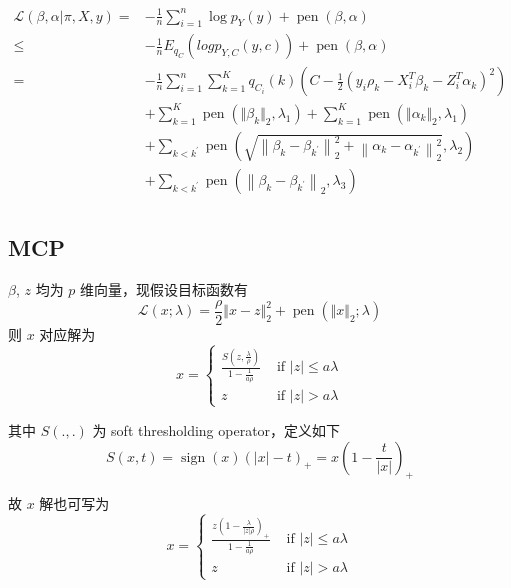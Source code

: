\documentclass[12pt, a4paper, oneside]{article}
\numberwithin{equation}{section}
\begin{document}
\begin{equation}
	\begin{aligned}
		\mathcal{L}(\beta,\alpha|\pi, X, y)
		=& -\frac1n\sum_{i=1}^{n}\log{p_Y(y)} + \operatorname{pen}(\beta, \alpha)\\
		\leq& -\frac1nE_{q_C} \left(log p_{Y,C}(y,c)\right) + \operatorname{pen}(\beta, \alpha) \\
		=& -\frac1n\sum_{i=1}^{n}\sum^{K}_{k=1} q_{C_i}(k)\left(C-\frac{1}{2}(y_i\rho_k - X_i^T \beta_k - Z_i^T \alpha_k)^2 \right) \\
		&+ \sum_{k=1}^{K} \operatorname{pen}\left(\Vert\beta_{k}\Vert_2, \lambda_{1}\right) 
		+ \sum_{k=1}^{K} \operatorname{pen}\left(\Vert\alpha_{k}\Vert_2, \lambda_{1}\right) \\
		&+\sum_{k<k^{\prime}} \operatorname{pen}\left(\sqrt{\left\|\beta_{k}-\beta_{k^{\prime}}\right\|_{2}^{2}+\left\|\alpha_{k}-\alpha_{k^{\prime}}\right\|_{2}^{2}}, \lambda_{2}\right) \\
		&+\sum_{k<k^{\prime}} \operatorname{pen}\left(\left\|\beta_{k}-\beta_{k^{\prime}}\right\|_{2}, \lambda_{3}\right) \\
	\end{aligned}
	\label{eq:object_coef_related}
\end{equation}

\subsection{MCP}

$\beta$, $z$ 均为 $p$ 维向量，现假设目标函数有
\begin{equation}
	\mathcal{L}(x;\lambda) = \frac{\rho}{2}\Vert x - z\Vert_2^2 + \operatorname{pen}(\Vert x\Vert_2;\lambda)
\end{equation}
则 $x$ 对应解为
\begin{equation}
	x = \begin{cases}\frac{S\left(z, \frac{\lambda}{\rho}\right)}{1-\frac{1}{a \rho}} & \text { if }|z| \leq a \lambda \\ z & \text { if }|z|>a \lambda\end{cases}
\end{equation}

其中 $S(.,.)$ 为 soft thresholding operator，定义如下
\begin{equation}
	S(x, t)=\operatorname{sign}(x)(|x|-t)_{+}=x\left(1-\frac{t}{|x|}\right)_{+}
\end{equation}

故 $x$ 解也可写为
\begin{equation}
	x = \begin{cases}\frac{
	z\left(1 - \frac{\lambda}{|z|\rho}\right)_+
}{1-\frac{1}{a \rho}} & \text { if }|z| \leq a \lambda \\ z & \text { if }|z|>a \lambda\end{cases}
\end{equation}
\end{document}
